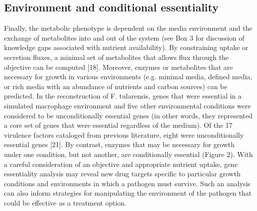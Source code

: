 \subsection{Environment and conditional essentiality}
Finally, the metabolic phenotype is dependent on the media 
environment and the exchange of metabolites into and out of 
the system (see Box 3 for discussion of knowledge gaps 
associated with nutrient availability). By constraining uptake 
or secretion fluxes, a minimal set of metabolites that allows 
flux through the objective can be computed [18]. Moreover, 
enzymes or metabolites that are necessary for growth in 
various environments (e.g. minimal media, defined media, 
or rich media with an abundance of nutrients and carbon sources) 
can be predicted. In the reconstruction of F. tularensis, 
genes that were essential in a simulated macrophage environment 
and five other environmental conditions were considered to be 
unconditionally essential genes (in other words, they 
represented a core set of genes that were essential regardless 
of the medium). Of the 17 virulence factors cataloged from 
previous literature, eight were unconditionally essential 
genes [21]. By contrast, enzymes that may be necessary for 
growth under one condition, but not another, are conditionally 
essential (Figure 2). With a careful consideration of an objective 
and appropriate nutrient uptake, gene essentiality analysis may 
reveal new drug targets specific to particular growth conditions 
and environments in which a pathogen must survive. Such an 
analysis can also inform strategies for manipulating the 
environment of the pathogen that could be effective as a 
treatment option.

